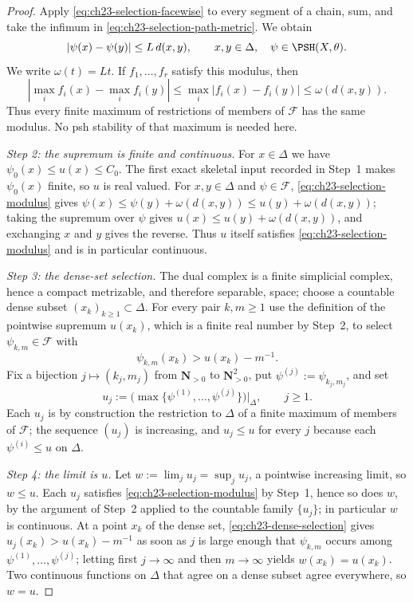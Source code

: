\begin{proof}
Apply \eqref{eq:ch23-selection-facewise} to every segment of a chain, sum,
and take the infimum in \eqref{eq:ch23-selection-path-metric}.  We obtain
\begin{equation}\label{eq:ch23-selection-modulus}
 |\psi(x)-\psi(y)|\leq L\,d(x,y),
 \qquad x,y\in\Delta,
 \quad \psi\in\PSH(X,\theta).
\end{equation}
We write \(\omega(t)=Lt\).  If \(f_1,\ldots,f_r\) satisfy this modulus, then
\[
 |\max_i f_i(x)-\max_i f_i(y)|
 \leq\max_i|f_i(x)-f_i(y)|
 \leq\omega(d(x,y)).
\]
Thus every finite maximum of restrictions of members of \(\mathcal F\) has
the same modulus.  No psh stability of that maximum is needed here.

\emph{Step 2: the supremum is finite and continuous.}
For \(x\in\Delta\) we have
\(\psi_0(x)\leq u(x)\leq C_0\).  The first exact skeletal input recorded in
Step~1 makes \(\psi_0(x)\) finite, so \(u\) is real valued.  For
\(x,y\in\Delta\) and \(\psi\in\mathcal F\),
\eqref{eq:ch23-selection-modulus} gives
\(\psi(x)\leq\psi(y)+\omega(d(x,y))\leq u(y)+\omega(d(x,y))\); taking the
supremum over \(\psi\) gives \(u(x)\leq u(y)+\omega(d(x,y))\), and
exchanging \(x\) and \(y\) gives the reverse.  Thus \(u\) itself satisfies
\eqref{eq:ch23-selection-modulus} and is in particular continuous.

\emph{Step 3: the dense-set selection.}
The dual complex is a finite simplicial complex, hence a compact metrizable,
and therefore separable, space; choose a countable dense subset
\((x_k)_{k\geq1}\subset\Delta\).  For every pair \(k,m\geq1\) use the
definition of the pointwise supremum \(u(x_k)\), which is a finite real
number by Step~2, to select \(\psi_{k,m}\in\mathcal F\) with
\begin{equation}\label{eq:ch23-dense-selection}
                     \psi_{k,m}(x_k)>u(x_k)-m^{-1}.
\end{equation}
Fix a bijection \(j\mapsto(k_j,m_j)\) from \(\mathbf N_{>0}\) to
\(\mathbf N_{>0}^2\), put \(\psi^{(j)}:=\psi_{k_j,m_j}\), and set
\begin{equation}\label{eq:ch23-selection-finite-maxima}
 u_j:=\bigl(\max\{\psi^{(1)},\ldots,\psi^{(j)}\}\bigr)\big|_\Delta,
 \qquad j\geq1 .
\end{equation}
Each \(u_j\) is by construction the restriction to \(\Delta\) of a finite
maximum of members of \(\mathcal F\); the sequence \((u_j)\) is increasing,
and \(u_j\leq u\) for every \(j\) because each \(\psi^{(i)}\leq u\) on
\(\Delta\).

\emph{Step 4: the limit is \(u\).}
Let \(w:=\lim_ju_j=\sup_ju_j\), a pointwise increasing limit, so
\(w\leq u\).  Each \(u_j\) satisfies \eqref{eq:ch23-selection-modulus} by
Step~1, hence so does \(w\), by the argument of Step~2 applied to the
countable family \(\{u_j\}\); in particular \(w\) is continuous.  At a point
\(x_k\) of the dense set, \eqref{eq:ch23-dense-selection} gives
\(u_j(x_k)>u(x_k)-m^{-1}\) as soon as \(j\) is large enough that
\(\psi_{k,m}\) occurs among \(\psi^{(1)},\ldots,\psi^{(j)}\); letting first
\(j\to\infty\) and then \(m\to\infty\) yields \(w(x_k)=u(x_k)\).  Two
continuous functions on \(\Delta\) that agree on a dense subset agree
everywhere, so \(w=u\).


\end{proof}
